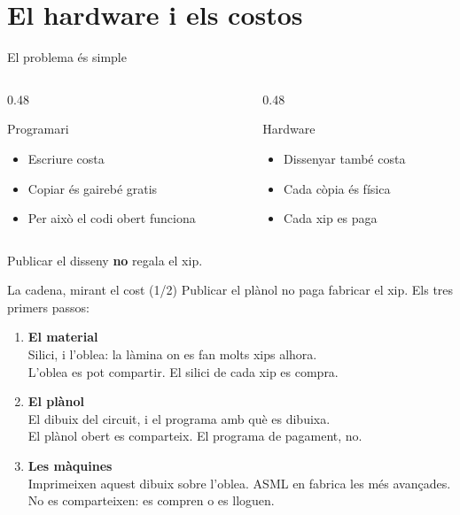 \documentclass[catalan]{beamer}
\begin{document}
\section{El hardware i els costos}

\begin{frame}{El problema és simple}
  \begin{columns}[T]
    \begin{column}{0.48\textwidth}
      \begin{exampleblock}{Programari}
        \begin{itemize}
          \item Escriure costa
          \item Copiar és gairebé gratis
          \item Per això el codi obert funciona
        \end{itemize}
      \end{exampleblock}
    \end{column}
    \begin{column}{0.48\textwidth}
      \begin{alertblock}{Hardware}
        \begin{itemize}
          \item Dissenyar també costa
          \item Cada còpia és física
          \item Cada xip es paga
        \end{itemize}
      \end{alertblock}
    \end{column}
  \end{columns}
  \vspace{0.45cm}
  \centering
  \Large Publicar el disseny \textbf{no} regala el xip.
\end{frame}

\begin{frame}{La cadena, mirant el cost (1/2)}
  Publicar el plànol no paga fabricar el xip. Els tres primers passos:
  \vspace{0.35cm}
  \begin{enumerate}
    \setlength{\itemsep}{0.55em}
    \item \textbf{El material}\\
      Silici, i l'oblea: la làmina on es fan molts xips alhora.\\
      \textcolor{green!50!black}{L'oblea es pot compartir.}
      \textcolor{red!65!black}{El silici de cada xip es compra.}
    \item \textbf{El plànol}\\
      El dibuix del circuit, i el programa amb què es dibuixa.\\
      \textcolor{green!50!black}{El plànol obert es comparteix.}
      \textcolor{red!65!black}{El programa de pagament, no.}
    \item \textbf{Les màquines}\\
      Imprimeixen aquest dibuix sobre l'oblea. ASML en fabrica les més avançades.\\
      \textcolor{red!65!black}{No es comparteixen: es compren o es lloguen.}
  \end{enumerate}
\end{frame}
\end{document}

